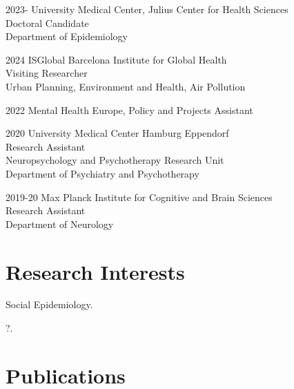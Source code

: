 \documentclass[12pt,letterpaper]{report}
\newcommand{\listitemspace}{0.15em}
\renewenvironment{itemize}
{\begin{list}{}{\setlength{\leftmargin}{0em}
            \setlength{\parskip}{0em}
            \setlength{\itemsep}{\listitemspace}
            \setlength{\parsep}{\listitemspace}}}
    {\end{list}}
\begin{document}
    \begin{tablist}
    
    	\item[2023-] \tab University Medical Center, Julius Center for Health Sciences \\
						  Doctoral Candidate \\
						  Department of Epidemiology

            \item[2024] \tab ISGlobal Barcelona Institute for Global Health \\
                             Visiting Researcher \\
                             Urban Planning, Environment and Health, Air Pollution
						  
		\item[2022] \tab Mental Health Europe, Policy and Projects Assistant

            \item[2020] \tab University Medical Center Hamburg Eppendorf \\
                            Research Assistant  \\
                            Neuropsychology and Psychotherapy Research Unit \\ Department of Psychiatry and Psychotherapy 
        
            \item[2019-20]  \tab Max Planck Institute for Cognitive and Brain Sciences \\
                          Research Assistant  \\
                          Department of Neurology

    \end{tablist}

    \section*{Research Interests}

    \begin{itemize}

        \item Social Epidemiology.

        \item ?.

    \end{itemize}

    \section*{Publications}
    
\end{document}
